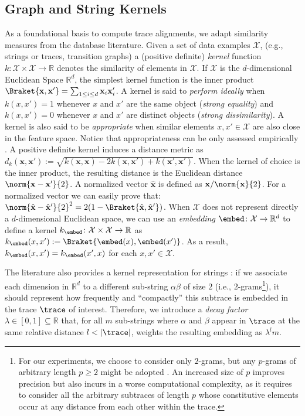 \subsection{Graph and String Kernels}\label{subsec:katk}
 As a foundational basis to compute trace alignments, we adapt similarity measures from the database literature.  Given a set of data examples $\mathcal{X}$, (e.g., strings or traces, transition graphs) a (positive definite) \emph{kernel} function $k\colon \mathcal{X}\times \mathcal{X}\to \mathbb{R}$ denotes the similarity of elements in $\mathcal{X}$. If $\mathcal{X}$ is the $d$-dimensional Euclidean Space $\mathbb{R}^d$, the simplest kernel function is the inner product $\Braket{\mathbf{x},\mathbf{x}'}=\sum_{1\leq i\leq d}\mathbf{x}_i\mathbf{x}'_i$.
A kernel is said to \emph{perform ideally} \cite{Gartner03} when $k(x,x')=1$ whenever $x$ and $x'$ are the same object (\textit{strong equality}) and $k(x,x')=0$ whenever $x$ and $x'$ are distinct objects (\textit{strong dissimilarity}). A kernel is also said to be \emph{appropriate} when similar elements $x,x'\in\mathcal{X}$ are also close in the feature space. Notice that appropriateness can be only assessed  empirically \cite{Gartner03}.
A positive definite kernel induces a distance metric as 
$
d_k(\mathbf{x},\mathbf{x}'):=\sqrt{k(\mathbf{x},\mathbf{x})-2k(\mathbf{x},\mathbf{x}')+k(\mathbf{x}',\mathbf{x}')}
$.
When the kernel of choice is the inner product, the resulting distance is the Euclidean distance $\norm{\mathbf{x}-\mathbf{x}'}{2}$. A normalized vector $\hat{\mathbf{x}}$ is defined as $\mathbf{x}/\norm{\mathbf{x}}{2}$. For a normalized vector we can easily prove that: $\norm{\hat{\mathbf{x}}-\hat{\mathbf{x}}'}{2}^2=2(1-\Braket{\hat{\mathbf{x}},\hat{\mathbf{x}}'})$.
When $\mathcal{X}$ does not represent directly a $d$-dimensional Euclidean space, we can use an \emph{embedding} $\embed\colon\mathcal{X}\to \mathbb{R}^d$ to define a kernel $k_\embed\colon \mathcal{X}\times \mathcal{X}\to\mathbb{R}$ as $k_\embed(x,x'):=\Braket{\embed(x),\embed(x')}$. As a result, $k_\embed(x,x')=k_\embed(x',x)$ for each $x,x'\in\mathcal{X}$.



 The literature also provides a kernel representation for strings \cite{LodhiSSCW02,GartnerFW03}: if we associate each dimension in $\mathbb{R}^d$ to a different sub-string $\alpha\beta$ of size $2$ (i.e., $2$-grams\footnote{\label{fn:caveat}For our experiments, we choose to consider only $2$-grams, but any $p$-grams of arbitrary length $p\geq 2$ might be adopted \cite{Gartner03}. An increased size of $p$ improves precision but also incurs in a worse computational complexity, as it requires to consider all the arbitrary subtraces of length $p$ whose constitutive elements occur at any distance from each other within the trace.}), it should represent how frequently and ``compactly'' this subtrace is embedded in the trace $\trace$ of interest. Therefore, we introduce a \emph{decay factor} $\lambda\in[0,1]\subseteq\mathbb{R}$ that, for all $m$ sub-strings where $\alpha$ and $\beta$ appear in $\trace$ at the same relative distance $l < |\trace|$, weights the resulting embedding as $\lambda^lm$.



